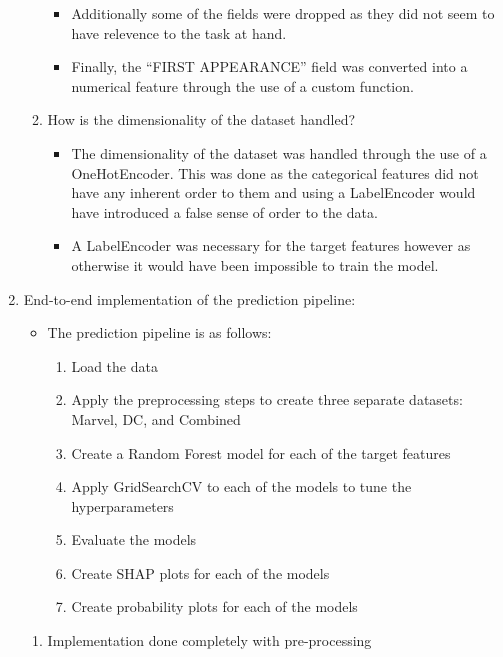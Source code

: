 \documentclass[12pt]{article}
\begin{document}
\begin{enumerate}
\begin{enumerate}
\begin{itemize}
                \item Additionally some of the fields were dropped as they did not seem to have relevence to the task at hand.
                \item Finally, the ``FIRST APPEARANCE'' field was converted into a numerical feature through the use of a custom function.
            \end{itemize}
            \item How is the dimensionality of the dataset handled?
            \begin{itemize}
                \item The dimensionality of the dataset was handled through the use of a OneHotEncoder. This was done as the categorical features did not have any inherent order to them and using a LabelEncoder would have introduced a false sense of order to the data.
                \item A LabelEncoder was necessary for the target features however as otherwise it would have been impossible to train the model.
            \end{itemize}
        \end{enumerate}
        \item End-to-end implementation of the prediction pipeline:
        \begin{itemize}
            \item The prediction pipeline is as follows:
            \begin{enumerate}
                \item Load the data
                \item Apply the preprocessing steps to create three separate datasets: Marvel, DC, and Combined
                \item Create a Random Forest model for each of the target features
                \item Apply GridSearchCV to each of the models to tune the hyperparameters
                \item Evaluate the models
                \item Create SHAP plots for each of the models
                \item Create probability plots for each of the models
            \end{enumerate}
        \end{itemize}
        \begin{enumerate}
            \item Implementation done completely with pre-processing

\end{enumerate}
\end{enumerate}
\end{document}
